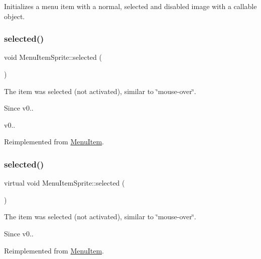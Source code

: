 Initializes a menu item with a normal, selected and disabled image with a callable object. \mbox{\label{classMenuItemSprite_a668b5d916cb926e161cc7ebdf96364e6}} 
\subsubsection{\texorpdfstring{selected()}{selected()}\hspace{0.1cm}{\footnotesize\ttfamily [1/2]}}
{\footnotesize\ttfamily void Menu\+Item\+Sprite\+::selected (\begin{DoxyParamCaption}{ }\end{DoxyParamCaption})\hspace{0.3cm}{\ttfamily [virtual]}}

The item was selected (not activated), similar to \char`\"{}mouse-\/over\char`\"{}. \begin{DoxySince}{Since}
v0..

v0.. 
\end{DoxySince}


Reimplemented from \hyperlink{classMenuItem_aa0330b2c1e2066eb7eee87ade6e6740f}{Menu\+Item}.

\mbox{\label{classMenuItemSprite_ab48a29704c139512abfb0835fecfa087}} 
\subsubsection{\texorpdfstring{selected()}{selected()}\hspace{0.1cm}{\footnotesize\ttfamily [2/2]}}
{\footnotesize\ttfamily virtual void Menu\+Item\+Sprite\+::selected (\begin{DoxyParamCaption}{ }\end{DoxyParamCaption})\hspace{0.3cm}{\ttfamily [virtual]}}

The item was selected (not activated), similar to \char`\"{}mouse-\/over\char`\"{}. \begin{DoxySince}{Since}
v0.. 
\end{DoxySince}


Reimplemented from \hyperlink{classMenuItem_aa0330b2c1e2066eb7eee87ade6e6740f}{Menu\+Item}.

